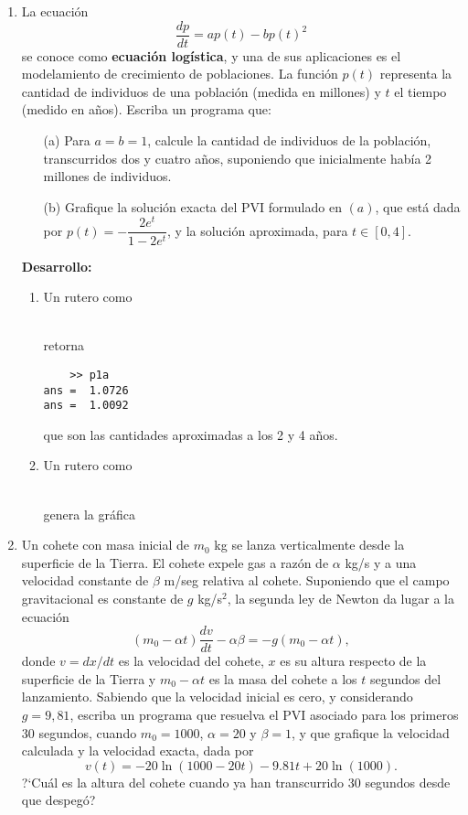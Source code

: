 \documentclass[letter,11pt]{article}
\begin{document}
\begin{enumerate}


\item La ecuaci\'on 
$$ \dfrac{dp}{dt} = ap(t) - bp(t)^2 $$
se conoce como \textbf{ecuaci\'on log\'istica}, y una de sus aplicaciones es el modelamiento de crecimiento de poblaciones. La funci\'on $p(t)$ representa la cantidad de individuos de una poblaci\'on (medida en millones) y $t$ el tiempo (medido en a\~nos). Escriba un programa \octave que:
\begin{itemize}
\item[(a)] Para $a=b=1$, calcule la cantidad de individuos de la poblaci\'on, transcurridos dos y cuatro a\~nos, suponiendo que inicialmente hab\'ia 2 millones de individuos.
\item[(b)] Grafique la soluci\'on exacta del PVI formulado en $(a)$, que est\'a dada por $p(t) = - \dfrac{2e^t}{1-2e^t}$, y la soluci\'on aproximada, para $t\in [0,4]$.
\end{itemize}

\textbf{Desarrollo:}
\begin{enumerate}
    \item Un rutero como
    
    
    \hfill{}\\
    retorna
    \begin{lstlisting}
    >> p1a
ans =  1.0726
ans =  1.0092
    \end{lstlisting}
        que son las cantidades aproximadas a los 2 y 4 a\~nos.
    
    \item Un rutero como
    
    \hfill{}\\
    genera la gr\'afica
    
\end{enumerate}

\item Un cohete con masa inicial de $m_0$ kg se lanza verticalmente desde la superficie de la Tierra. El cohete expele gas a raz\'on de $\alpha$ kg/s y a una velocidad constante de $\beta$ m/seg relativa al cohete. Suponiendo que el campo gravitacional es constante de $g$ kg/s$^2$, la segunda ley de Newton da lugar a la ecuaci\'on
$$ (m_0 - \alpha t)\dfrac{dv}{dt} - \alpha\beta = -g(m_0 - \alpha t), $$
donde $v=dx/dt$ es la velocidad del cohete, $x$ es su altura respecto de la superficie de la Tierra y $m_0 - \alpha t$ es la masa del cohete a los $t$ segundos del lanzamiento. Sabiendo que la velocidad inicial es cero, y considerando $g=9,81$, escriba un programa \octave que resuelva el PVI asociado para los primeros 30 segundos, cuando $m_0=1000$, $\alpha = 20$ y $\beta = 1$, y que grafique la velocidad calculada y la velocidad exacta, dada por 
$$ v (t) = -20\ln(1000 - 20t) - 9.81 t + 20\ln(1000). $$
?`Cu\'al es la altura del cohete cuando ya han transcurrido 30 segundos desde que despeg\'o?


\end{enumerate}
\end{document}
